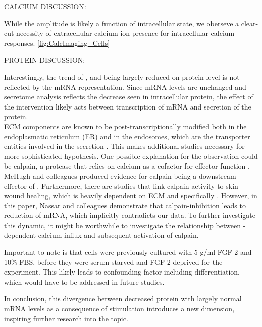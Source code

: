 CALCIUM DISCUSSION:

While the amplitude is likely a function of intracellular state, we oberseve a clear-cut necessity of extracellular calcium-ion presence for intracellular calcium responses. \ref{fig:CalcImaging_Cells}



PROTEIN DISCUSSION:


Interestingly, the trend of \colone{}, \colthree{} and \Fn{} being largely reduced on protein level is not reflected by the mRNA representation. Since mRNA levels are unchanged and secretome analysis reflects the decrease seen in intracellular protein, the effect of the intervention likely acts between transcription of mRNA and secretion of the protein. \\


ECM components are known to be post-transcriptionally modified both in the endoplasmatic reticulum (ER) and in the endosomes, which are the transporter entities involved in the secretion \cite{Ishida2011, Zeltz2014}. This makes additional studies necessary for more sophisticated hypothesis. One possible explanation for the observation could be calpain, a protease that relies on calcium as a cofactor for effector function \cite{Goll2003}. McHugh and colleagues produced evidence for calpain being a downstream effector of \Piezo{} \cite{McHugh2010}. Furthermore, there are studies that link calpain activity to skin wound healing, which is heavily dependent on ECM and specifically \colone{} \cite{Nassar2012}. However, in this paper, Nassar and colleagues demonstrate that calpain-inhibition leads to reduction of \colone{} mRNA, which implicitly contradicts our data. To further investigate this dynamic, it might be worthwhile to investigate the relationship between \Piezo{}-dependent calcium influx and subsequent activation of calpain. \par

Important to note is that cells were previously cultured with 5 \textmu{}g/ml FGF-2 and 10\% FBS, before they were serum-starved and FGF-2 deprived for the experiment. This likely leads to confounding factor including differentiation, which would have to be addressed in future studies.\par

In conclusion, this divergence between decreased protein with largely normal mRNA levels as a consequence of \Piezo{} stimulation introduces a new dimension, inspiring further research into the topic.

